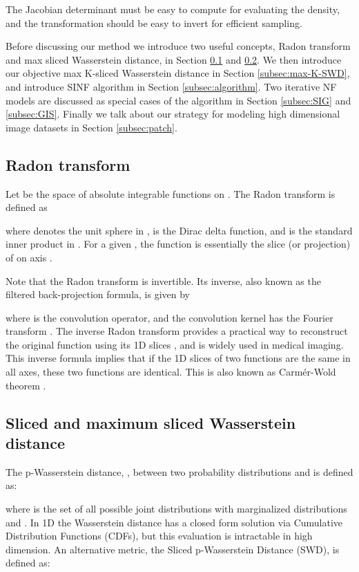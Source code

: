 \documentclass{article}
\begin{document}
The Jacobian determinant  must be easy to compute for evaluating the density, and the transformation  should be easy to invert for efficient sampling.

Before discussing our method we introduce two useful concepts, Radon transform and max sliced Wasserstein distance, in Section \ref{subsec:radon} and \ref{subsec:SWD}. We then introduce our objective max K-sliced Wasserstein distance in Section \ref{subsec:max-K-SWD}, and introduce SINF algorithm in Section \ref{subsec:algorithm}. Two iterative NF models are discussed as special cases of the algorithm in Section \ref{subsec:SIG} and \ref{subsec:GIS}. Finally we talk about our strategy for modeling high dimensional image datasets in Section \ref{subsec:patch}.

\subsection{Radon transform}
\label{subsec:radon}

Let  be the space of absolute integrable functions on . The Radon transform  is defined as 

where  denotes the unit sphere  in ,  is the Dirac delta function, and  is the standard inner product in . For a given , the function  is essentially the slice (or projection) of  on axis .

Note that the Radon transform  is invertible. Its inverse, also known as the filtered back-projection formula, is given by \citep{helgason2010integral, kolouri2019generalized}

where  is the convolution operator, and the convolution kernel  has the Fourier transform . The inverse Radon transform provides a practical way to reconstruct the original function  using its 1D slices , and is widely used in medical imaging. This inverse formula implies that if the 1D slices of two functions are the same in all axes, these two functions are identical. This is also known as Carm{\'e}r-Wold theorem \citep{cramer1936some}.

\subsection{Sliced and maximum sliced Wasserstein distance}
\label{subsec:SWD}

The p-Wasserstein distance, , between two probability distributions  and  is defined as:

where  is the set of all possible joint distributions  with marginalized distributions  and . In 1D the Wasserstein distance has a closed form solution via Cumulative Distribution Functions (CDFs), but this evaluation is intractable in high dimension. An alternative metric, the Sliced p-Wasserstein Distance (SWD), is defined as:
\end{document}
